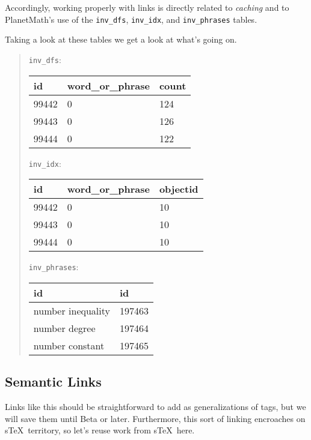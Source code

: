 \documentclass{article}
\begin{document}
Accordingly, working properly with links is directly
related to \emph{caching} and to PlanetMath's use of the
\verb|inv_dfs|, \verb|inv_idx|, and \verb|inv_phrases|
tables.

Taking a look at these tables we get a look at what's going on.

\begin{quote}
\begin{minipage}{5in}
\verb|inv_dfs|:
\begin{tabular}{|lll|}
\hline
{\bf id} &  {\bf word\_or\_phrase} & {\bf count} \\
\hline
99442 &              0 &   124 \\
99443 &              0 &   126 \\
99444 &              0 &   122 \\
\hline
\end{tabular}

\medskip

\verb|inv_idx|:
\begin{tabular}{|lll|}
\hline
{\bf id} &  {\bf word\_or\_phrase} & {\bf objectid} \\
\hline
99442 &              0 &   10 \\
99443 &              0 &   10 \\
99444 &              0 &   10 \\
\hline
\end{tabular}

\medskip

\verb|inv_phrases|:
\begin{tabular}{|ll|}
\hline
{\bf id} & {\bf id} \\
\hline
number inequality &     197463 \\
number degree     &     197464 \\
number constant   &     197465 \\
\hline
\end{tabular}
\end{minipage}
\end{quote}

\subsection{Semantic Links}

Links like this should be straightforward to add as
generalizations of tags, but we will save them until Beta
or later.  Furthermore, this sort of linking encroaches on
s\TeX\ territory, so let's reuse work from s\TeX\ here.
\end{document}
